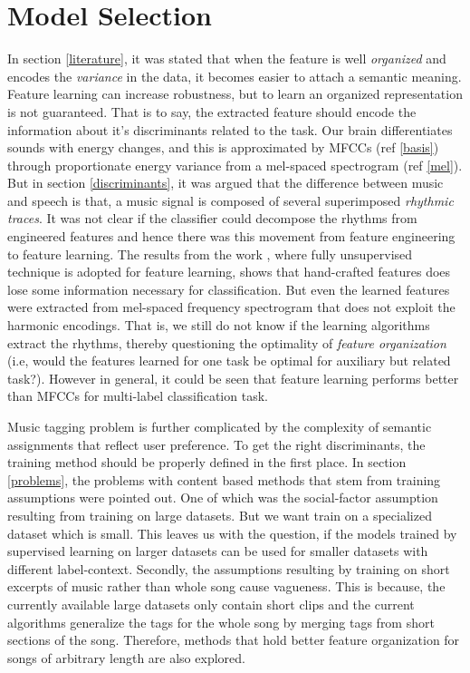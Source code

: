 \section{Model Selection}
\label{model}
In section \ref{literature}, it was stated that when the feature is well \textit{organized} and encodes the \textit{variance} in the data, it becomes easier to attach a semantic meaning. Feature learning can increase robustness, but to learn an organized representation is not guaranteed. That is to say, the extracted feature should encode the information about it's discriminants  related to the task. Our brain differentiates sounds with energy changes, and this is approximated by MFCCs (ref \ref{basis}) through proportionate energy variance from a mel-spaced spectrogram (ref \ref{mel}). But in section \ref{discriminants}, it was argued that the difference between music and speech is that, a music signal is composed of several superimposed \textit{rhythmic traces}. It was not clear if the classifier could decompose the rhythms from engineered features and hence there was this movement from feature engineering to feature learning. The results from the work \cite{MultiScale}, where fully unsupervised technique is adopted for feature learning, shows that hand-crafted features does lose some information necessary for classification. But even the learned features were extracted from mel-spaced frequency spectrogram that does not exploit the harmonic encodings. That is, we still do not know if the learning algorithms extract the rhythms, thereby questioning the optimality of \textit{feature organization} (i.e, would the features learned for one task be optimal for auxiliary but related task?). However in general, it could be seen that feature learning performs better than MFCCs for multi-label classification task.   
\bigskip

\noindent Music tagging problem is further complicated by the complexity of semantic assignments that reflect user preference. To get the right discriminants, the training method should be properly defined in the first place. In section \ref{problems}, the problems with content based methods that stem from training assumptions were pointed out. One of which was the social-factor assumption resulting from training on large datasets. But we want train on a specialized dataset which is small. This leaves us with the question, if the models trained by supervised learning on larger datasets\cite{choi_cnn}\cite{EndToEnd} can be used for smaller datasets with different label-context. Secondly, the assumptions resulting by training on short excerpts of music rather than whole song cause  vagueness. This is because, the currently available large datasets only contain short clips and the current algorithms generalize the tags for the whole song by merging tags from short sections of the song. Therefore, methods that hold better feature organization for songs of arbitrary length are also explored.   

